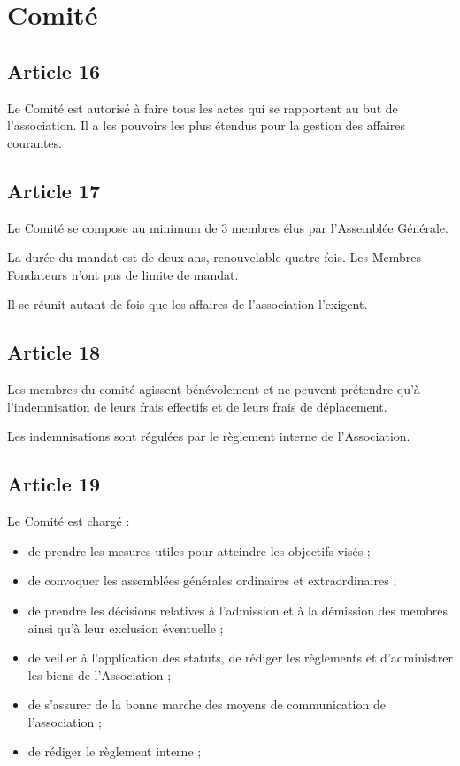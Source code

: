\documentclass[12pt,twoside]{report}
\begin{document}
\chapter*{Comité}

\section*{Article 16}
Le Comité est autorisé à faire tous les actes qui se rapportent au but de l'association. Il a les pouvoirs les plus étendus pour la gestion des affaires courantes.

\section*{Article 17}
Le Comité se compose au minimum de 3 membres élus par l’Assemblée Générale.

La durée du mandat est de deux ans, renouvelable quatre fois. Les Membres Fondateurs n’ont pas de limite de mandat.

Il se réunit autant de fois que les affaires de l'association l'exigent.

\section*{Article 18}
Les membres du comité agissent bénévolement et ne peuvent prétendre qu'à l'indemnisation de leurs frais effectifs et de leurs frais de déplacement.

Les indemnisations sont régulées par le règlement interne de l’Association.

\section*{Article 19}
Le Comité est chargé :
\begin{itemize}
\item de prendre les mesures utiles pour atteindre les objectifs visés ; 
\item de convoquer les assemblées générales ordinaires et extraordinaires ; 
\item de prendre les décisions relatives à l’admission et à la démission des membres ainsi qu’à leur exclusion éventuelle ; 
\item de veiller à l’application des statuts, de rédiger les règlements et d’administrer les biens de l’Association ; 
\item de s'assurer de la bonne marche des moyens de communication de l'association ; 
\item de rédiger le règlement interne ;
\end{itemize}
\end{document}
